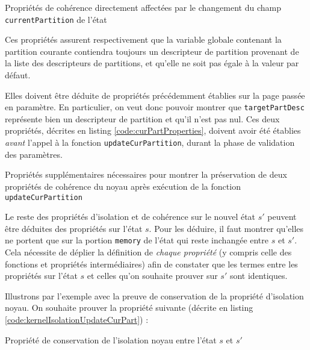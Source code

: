 			\begin{listing}[!ht]
				\caption{Propriétés de cohérence directement affectées par le changement du champ \texttt{currentPartition} de l'état}
				\label{code:consistencyCurPart}
			\end{listing}

			Ces propriétés assurent respectivement que la variable globale contenant la partition courante contiendra toujours un descripteur de partition provenant de la liste des descripteurs de partitions, et qu'elle ne soit pas égale à la valeur par défaut.

			Elles doivent être déduite de propriétés précédemment établies sur la page passée en paramètre. En particulier, on veut donc pouvoir montrer que \texttt{targetPartDesc} représente bien un descripteur de partition et qu'il n'est pas nul. Ces deux propriétés, décrites en listing \ref{code:curPartProperties}, doivent avoir été établies \emph{avant} l'appel à la fonction \texttt{updateCurPartition}, durant la phase de validation des paramètres.

			\begin{listing}[!ht]
				\caption{Propriétés supplémentaires nécessaires pour montrer la préservation de deux propriétés de cohérence du noyau après exécution de la fonction \texttt{updateCurPartition}}
				\label{code:curPartProperties}
			\end{listing}

			Le reste des propriétés d'isolation et de cohérence sur le nouvel état $s'$ peuvent être déduites des propriétés sur l'état $s$. Pour les déduire, il faut montrer qu'elles ne portent que sur la portion \texttt{memory} de l'état qui reste inchangée entre $s$ et $s'$. Cela nécessite de déplier la définition de \emph{chaque propriété} (y compris celle des fonctions et propriétés intermédiaires) afin de constater que les termes entre les propriétés sur l'état $s$ et celles qu'on souhaite prouver sur $s'$ sont identiques.

			Illustrons par l'exemple avec la preuve de conservation de la propriété d'isolation noyau. On souhaite prouver la propriété suivante (décrite en listing \ref{code:kernelIsolationUpdateCurPart}) : 

			\begin{listing}[!ht]
				\caption{Propriété de conservation de l'isolation noyau entre l'état $s$ et $s'$}
				\label{code:kernelIsolationUpdateCurPart}
			\end{listing}
			\label{sec:curPartKernelIsolation}

